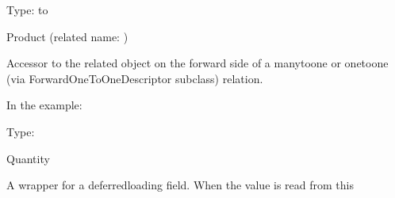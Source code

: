 \documentclass[letterpaper,10pt,russian]{sphinxmanual}
\begin{document}
\begin{fulllineitems}
\begin{fulllineitems}
\label{\detokenize{myapp:polls.models.OrderItem.product}}
\pysigstartsignatures
\pysigline
{}
\pysigstopsignatures
\sphinxAtStartPar
Type:  to {\hyperref[\detokenize{myapp:polls.models.Product}]{}}

\sphinxAtStartPar
Product (related name: )

\sphinxAtStartPar
Accessor to the related object on the forward side of a many\sphinxhyphen{}to\sphinxhyphen{}one or
one\sphinxhyphen{}to\sphinxhyphen{}one (via ForwardOneToOneDescriptor subclass) relation.

\sphinxAtStartPar
In the example:

\begin{sphinxVerbatim}[commandchars=\\\{\}]
       
\end{sphinxVerbatim}

\end{fulllineitems}


\begin{fulllineitems}
\label{\detokenize{myapp:polls.models.OrderItem.quantity}}
\pysigstartsignatures
\pysigline
{}
\pysigstopsignatures
\sphinxAtStartPar
Type: 

\sphinxAtStartPar
Quantity

\sphinxAtStartPar
A wrapper for a deferred\sphinxhyphen{}loading field. When the value is read from this

\end{fulllineitems}



\end{fulllineitems}
\end{document}
